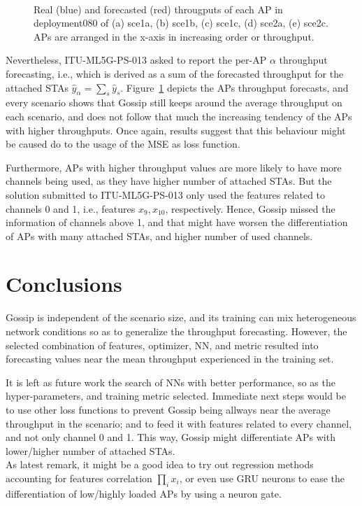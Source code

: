 \documentclass{article}
\begin{document}
\begin{figure}[h!]
{        \label{fig:provisioning-comparison}%
    }%
    \\ %
    \caption[]{Real (blue) and forecasted (red) througputs
    of each AP in deployment080 of (a) sce1a, (b) sce1b,
    (c) sce1c, (d) sce2a, (e) sce2c. APs are arranged
    in the x-axis in increasing order or throughput.}
    \label{fig:aps}%
\end{figure}

Nevertheless, ITU-ML5G-PS-013 asked to report the per-AP $\alpha$
throughput forecasting, i.e., which is derived as
a sum of the forecasted throughput for the attached
STAs $\hat{y}_\alpha = \sum_s \hat{y}_s$.
Figure~\ref{fig:aps} depicts the APs throughput
forecasts, and every scenario shows that Gossip still
keeps around the average throughput on each scenario,
and does not follow that much the increasing tendency
of the APs with higher throughputs.
Once again, results suggest that this behaviour might
be caused do to the usage of the MSE as loss function.

Furthermore, APs with higher throughput values are more
likely to have more channels being used, as they have
higher number of attached STAs.
But the solution submitted to ITU-ML5G-PS-013 only
used the features related to channels 0 and 1, i.e.,
features $x_9, x_{10}$, respectively.
Hence, Gossip missed the information of channels above
1, and that might have worsen the differentiation of
APs with many attached STAs, and higher number of
used channels.


\section{Conclusions}
Gossip is independent of the scenario size, and
its training can mix heterogeneous network conditions
so as to generalize the throughput forecasting.
However, the selected combination of features,
optimizer, NN, and metric resulted into forecasting
values near the mean throughput experienced in
the training set.

It is left as future work the search of NNs with
better performance, so as the hyper-parameters,
and training metric selected.
Immediate next steps would be to use other loss
functions to prevent Gossip being allways near the
average throughput in the scenario; and to feed it with
features related to every channel, and not only channel
0 and 1.
This way, Gossip might differentiate APs with lower/higher
number of attached STAs.\\
As latest remark, it might be a good idea to try out
regression methods accounting for features correlation
$\prod_ix_i$, or even use GRU neurons to ease the
differentiation of low/highly loaded APs by using a neuron gate.
\end{document}
